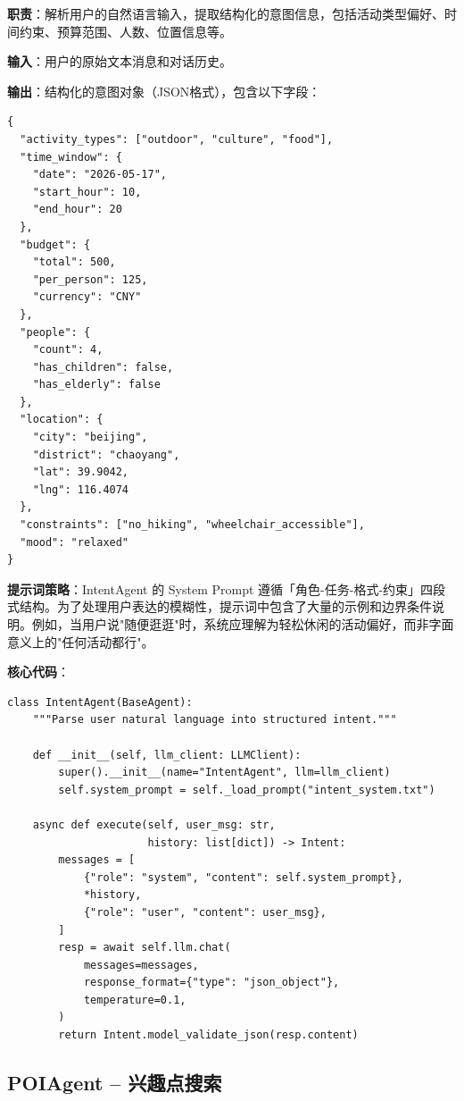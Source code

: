 \documentclass[12pt,a4paper]{ctexart}
\begin{document}
\textbf{职责}：解析用户的自然语言输入，提取结构化的意图信息，包括活动类型偏好、时间约束、预算范围、人数、位置信息等。

\textbf{输入}：用户的原始文本消息和对话历史。

\textbf{输出}：结构化的意图对象（JSON格式），包含以下字段：

\begin{lstlisting}[caption={IntentAgent 输出结构},label={lst:intent-output}]
{
  "activity_types": ["outdoor", "culture", "food"],
  "time_window": {
    "date": "2026-05-17",
    "start_hour": 10,
    "end_hour": 20
  },
  "budget": {
    "total": 500,
    "per_person": 125,
    "currency": "CNY"
  },
  "people": {
    "count": 4,
    "has_children": false,
    "has_elderly": false
  },
  "location": {
    "city": "beijing",
    "district": "chaoyang",
    "lat": 39.9042,
    "lng": 116.4074
  },
  "constraints": ["no_hiking", "wheelchair_accessible"],
  "mood": "relaxed"
}
\end{lstlisting}

\textbf{提示词策略}：IntentAgent 的 System Prompt 遵循「角色-任务-格式-约束」四段式结构。为了处理用户表达的模糊性，提示词中包含了大量的示例和边界条件说明。例如，当用户说"随便逛逛"时，系统应理解为轻松休闲的活动偏好，而非字面意义上的"任何活动都行"。

\textbf{核心代码}：

\begin{lstlisting}[caption={IntentAgent 核心实现},label={lst:intent-agent}]
class IntentAgent(BaseAgent):
    """Parse user natural language into structured intent."""

    def __init__(self, llm_client: LLMClient):
        super().__init__(name="IntentAgent", llm=llm_client)
        self.system_prompt = self._load_prompt("intent_system.txt")

    async def execute(self, user_msg: str,
                      history: list[dict]) -> Intent:
        messages = [
            {"role": "system", "content": self.system_prompt},
            *history,
            {"role": "user", "content": user_msg},
        ]
        resp = await self.llm.chat(
            messages=messages,
            response_format={"type": "json_object"},
            temperature=0.1,
        )
        return Intent.model_validate_json(resp.content)
\end{lstlisting}

\subsection{POIAgent -- 兴趣点搜索}
\end{document}
